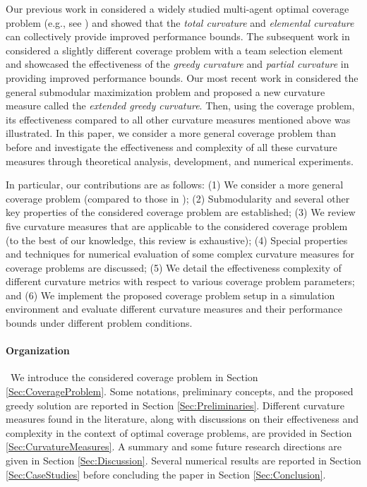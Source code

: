 \documentclass[letterpaper, 10 pt, conference]{ieeeconf}
\begin{document}
Our previous work in \cite{Sun2019} considered a widely studied multi-agent optimal coverage problem (e.g., see \cite{Zhong2011,Welikala2019J1}) and showed that the \emph{total curvature} \cite{Conforti1984} and \emph{elemental curvature} \cite{Wang2016} can collectively provide improved performance bounds. The subsequent work in \cite{Sun2020} considered a slightly different coverage problem with a team selection element and showcased the effectiveness of the \emph{greedy curvature} \cite{Conforti1984} and \emph{partial curvature} \cite{Liu2018} in providing improved performance bounds. Our most recent work in \cite{WelikalaJ02021} considered the general submodular maximization problem and proposed a new curvature measure called the \emph{extended greedy curvature}. Then, using the coverage problem, its effectiveness compared to all other curvature measures mentioned above was illustrated. 
In this paper, we consider a more general coverage problem than before and investigate the effectiveness and complexity of all these curvature measures through theoretical analysis, development, and numerical experiments. 
   


In particular, our contributions are as follows: 
(1) We consider a more general coverage problem (compared to those in \cite{WelikalaJ02021,Sun2019});
(2) Submodularity and several other key properties of the considered coverage problem are established; 
(3) We review five curvature measures that are applicable to the considered coverage problem (to the best of our knowledge, this review is exhaustive);
(4) Special properties and techniques for numerical evaluation of some complex curvature measures for coverage problems are discussed; 
(5) We detail the effectiveness complexity of different curvature metrics with respect to various coverage problem parameters; and 
(6) We implement the proposed coverage problem setup in a simulation environment and evaluate different curvature measures and their performance bounds under different problem conditions.






\paragraph*{Organization}\ 
We introduce the considered coverage problem in Section \ref{Sec:CoverageProblem}. Some notations, preliminary concepts, and the proposed greedy solution are reported in Section \ref{Sec:Preliminaries}. Different curvature measures found in the literature, along with discussions on their effectiveness and complexity in the context of optimal coverage problems, are provided in Section \ref{Sec:CurvatureMeasures}. 
A summary and some future research directions are given in Section \ref{Sec:Discussion}. 
Several numerical results are reported in Section \ref{Sec:CaseStudies} before concluding the paper in Section \ref{Sec:Conclusion}. 
\end{document}
